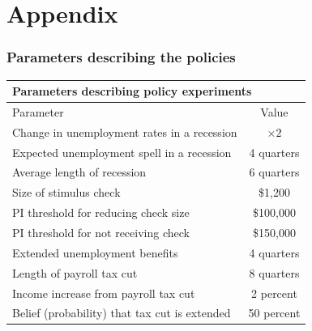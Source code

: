 \documentclass[pdflatex,aspectratio=169]{beamer}
\begin{document}
\section{Appendix}


\begin{frame}
	\frametitle{Parameters describing the policies}
	\label{sli:policies}
	\centering 
	\begin{tabular}{lc}
		\toprule 
		\multicolumn{2}{l}{Parameters describing policy experiments} \\ \midrule 
		Parameter & Value \\ \midrule 
		Change in unemployment rates in a recession & $\times 2$ \\ 
		Expected unemployment spell in a recession & 4 quarters \\ 
		Average length of recession & 6 quarters \\ 
		Size of stimulus check & \$1,200 \\ 
		PI threshold for reducing check size & \$100,000 \\ 
		PI threshold for not receiving check & \$150,000 \\ 
		Extended unemployment benefits & 4 quarters \\
		Length of payroll tax cut & 8 quarters \\ 
		Income increase from payroll tax cut & 2 percent \\ 
		Belief (probability) that tax cut is extended & 50 percent 		
		\\ \bottomrule
	\end{tabular}

	\vspace{1cm}
	\hyperlink{Parameters}{} 
\end{frame}
\end{document}
